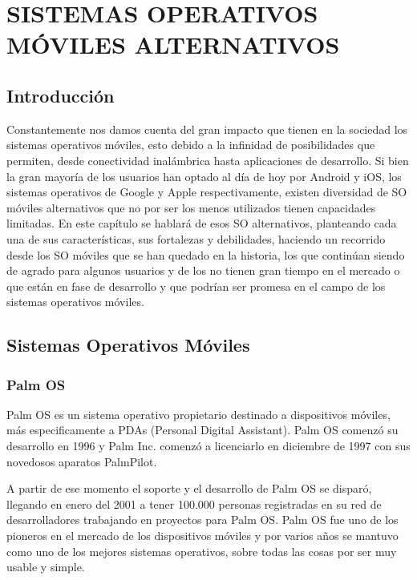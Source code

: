 \chapter{SISTEMAS OPERATIVOS MÓVILES ALTERNATIVOS}

\section*{Introducción}
Constantemente nos damos cuenta del gran impacto que tienen en la sociedad los sistemas operativos móviles, esto debido a la infinidad de posibilidades que permiten, desde conectividad inalámbrica hasta aplicaciones de desarrollo. Si bien la gran mayoría de los usuarios han optado al día de hoy por Android y iOS, los sistemas operativos de Google y Apple respectivamente, existen diversidad de SO móviles alternativos que no por ser los menos utilizados tienen capacidades limitadas. En este capítulo se hablará de esos SO alternativos, planteando cada una de sus características, sus fortalezas y debilidades, haciendo un recorrido desde los SO móviles que se han quedado en la historia, los que continúan siendo de agrado para algunos usuarios y de los no tienen gran tiempo en el mercado o que están en fase de desarrollo y que podrían ser promesa en el campo de los sistemas operativos móviles.

\section*{Sistemas Operativos Móviles}
\subsection*{Palm OS}
Palm OS es un sistema operativo propietario destinado a dispositivos móviles, más especificamente a PDAs (Personal Digital Assistant). Palm OS comenzó su desarrollo en 1996 y Palm Inc. comenzó a licenciarlo en diciembre de 1997 con sus novedosos aparatos PalmPilot.                                               

A partir de ese momento el soporte y el desarrollo de Palm OS se disparó, llegando en enero del 2001 a tener 100.000 personas registradas en su 
red de desarrolladores trabajando en proyectos para Palm OS. Palm OS fue uno de los pioneros en el mercado de los dispositivos móviles y por 
varios años se mantuvo como uno de los mejores sistemas operativos, sobre todas las cosas por ser muy usable y simple.                                                                                                                                                                                    
                                                                                                                                                                              
